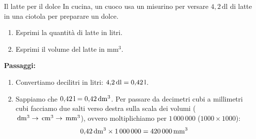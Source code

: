 \begin{esercizio}{Il latte per il dolce}
In cucina, un cuoco usa un misurino per versare $4{,}2\,\mathrm{dl}$ di latte in una ciotola per preparare un dolce.

\begin{enumerate}[label=\alph*)]
  \item Esprimi la quantità di latte in litri.
  \item Esprimi il volume del latte in $\mathrm{mm^3}$.
\end{enumerate}

\responsespace{10cm}

\begin{soluzione}
  \textbf{Passaggi:}
  \begin{enumerate}[label=\alph*)]
    \item Convertiamo decilitri in litri: $4{,}2\,\mathrm{dl} = 0{,}42\,\mathrm{l}$.
    \item Sappiamo che $0{,}42\,\mathrm{l} = 0{,}42\,\mathrm{dm^3}$. Per passare da decimetri cubi a millimetri cubi facciamo due salti verso destra sulla scala dei volumi ($\,\mathrm{dm^3} \to \,\mathrm{cm^3} \to \,\mathrm{mm^3}$), ovvero moltiplichiamo per $1\,000\,000$ ($1000 \times 1000$):
    \[
    0{,}42\,\mathrm{dm^3} \times 1\,000\,000 = 420\,000\,\mathrm{mm^3}
    \]
  \end{enumerate}
\end{soluzione}
\end{esercizio}

